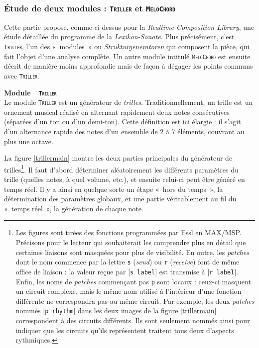 \documentclass[a4paper,12pt]{article}
\newcommand{\guill}[1]{«~#1~»}
\newcommand{\module}[1]{\texttt{\textsc{#1}}}
\newcommand{\patch}[1]{[\texttt{#1}]}
\begin{document}
\subsubsection{Étude de deux modules : \textnormal{\module{Triller}} et \textnormal{\module{MeloChord}}}
\label{lsmodules}

Cette partie propose, comme ci-dessus pour la \emph{Realtime Composition Library}, une étude détaillée du programme de la \emph{Lexikon-Sonate}. Plus précisément, c'est \module{Triller}, l'un des \guill{modules} ou \emph{Strukturgeneratoren} qui composent la pièce, qui fait l'objet d'une analyse complète. Un autre module intitulé \module{MeloChord} est ensuite décrit de manière moins approfondie mais de façon à dégager les points communs avec \module{Triller}.

\textbf{Module~~\textnormal{\module{Triller}}} \\
Le module \module{Triller} est un générateur de \emph{trilles}. Traditionnellement, un trille est un ornement musical réalisé en alternant rapidement deux notes consécutives (séparées d'un ton ou d'un demi-ton). Cette définition est ici élargie : il s'agit d'un alternance rapide des notes d'un ensemble de 2 à 7 éléments, couvrant au plus une octave.

La figure \ref{trillermain} montre les deux parties principales du générateur de trilles\footnote{Les figures sont tirées des fonctions programmées par Essl en MAX/MSP. Précisons pour le lecteur qui souhaiterait les comprendre plus en détail que certaines liaisons sont masquées pour plus de visibilité. En outre, les \emph{patches} dont le nom commence par la lettre \texttt{s} (\emph{send}) ou \texttt{r} (\emph{receive}) font de même office de liaison : la valeur reçue par \patch{s label} est transmise à \patch{r label}. Enfin, les noms de \emph{patches} commençant pas \texttt{p} sont locaux : ceux-ci masquent un circuit complexe, mais le même nom utilisé à l'intérieur d'une fonction différente ne correspondra pas au même circuit. Par exemple, les deux \emph{patches} nommés \patch{p rhythm} dans les deux images de la figure \ref{trillermain} correspondent à des circuits différents. Ils sont seulement nommés ainsi pour indiquer que les circuits qu'ils représentent traitent tous deux d'aspects rythmiques.}. Il faut d'abord déterminer aléatoirement les différents paramètres du trille (quelles notes, à quel volume, etc.), et ensuite celui-ci peut être généré en temps réel. Il y a ainsi en quelque sorte un étape \guill{hors du temps}, la détermination des paramètres globaux, et une partie véritablement au fil du \guill{temps réel}, la génération de chaque note.
\end{document}
